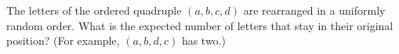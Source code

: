 The letters of the ordered quadruple $(a,b,c,d)$ are rearranged in a uniformly random order. What is the expected number of letters that stay in their original position? (For example, $(a,b,d,c)$ has two.)
